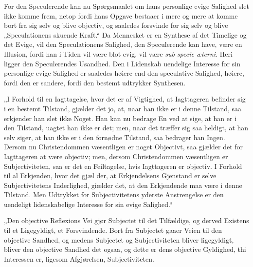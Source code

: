 For den Speculerende kan nu Spørgsmaalet om hans personlige evige
Salighed slet ikke komme frem, netop fordi hans Opgave bestaaer i
mere og mere at komme bort fra sig selv og blive objectiv, og
saaledes forsvinde for sig selv og blive „Speculationens skuende
Kraft.“ Da Mennesket er en Synthese af det Timelige og det Evige,
vil den Speculationens Salighed, den Speculerende kan have, være
en Illusion, fordi han i Tiden vil være blot evig, vil være
\textit{sub specie æterni}. Heri ligger den Speculerendes
Usandhed. Den i Lidenskab uendelige Interesse for sin personlige
evige Salighed er saaledes høiere end den speculative Salighed,
høiere, fordi den er sandere, fordi den bestemt udtrykker
Synthesen.

„I Forhold til en Iagttagelse, hvor det er af Vigtighed, at
Iagttageren befinder sig i en bestemt Tilstand, gjælder det jo,
at, naar han ikke er i denne Tilstand, saa erkjender han slet ikke
Noget. Han kan nu bedrage En ved at sige, at han er i den
Tilstand, uagtet han ikke er det; men, naar det træffer sig saa
heldigt, at han selv siger, at han ikke er i den fornødne
Tilstand, saa bedrager han Ingen. Dersom nu Christendommen
væsentligen er noget Objectivt, saa gjælder det for Iagttageren at
være objectiv; men, dersom Christendommen væsentligen er
Subjectiviteten, saa er det en Feiltagelse, hvis Iagttageren er
objectiv. I Forhold til al Erkjenden, hvor det gjæl%
der, at Erkjendelsens Gjenstand er selve Subjectivitetens
Inderlighed, giælder det, at den Erkjendende maa være i denne
Tilstand. Men Udtrykket for Subjectivitetens yderste Anstrengelse
er den uendeligt lidenskabelige Interesse for sin evige
Salighed.“

„Den objective Reflexions Vei gjør Subjectet til det Tilfældige,
og derved Existens til et Ligegyldigt, et Forsvindende. Bort fra
Subjectet gaaer Veien til den objective Sandhed, og medens
Subjectet og Subjectiviteten bliver ligegyldigt, bliver den
objective Sandhed det ogsaa, og dette er dens objective Gyldighed,
thi Interessen er, ligesom Afgjørelsen, Subjectiviteten.

